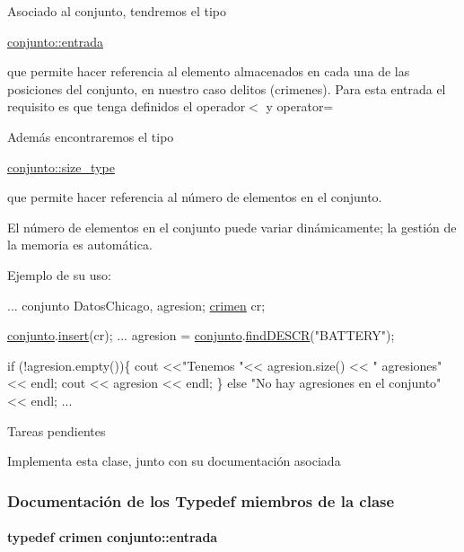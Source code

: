 Asociado al conjunto, tendremos el tipo
\begin{DoxyCode}
\hyperlink{classcrimen}{conjunto::entrada} 
\end{DoxyCode}
 que permite hacer referencia al elemento almacenados en cada una de las posiciones del conjunto, en nuestro caso delitos (crimenes). Para esta entrada el requisito es que tenga definidos el operador$<$ y operator=

Además encontraremos el tipo
\begin{DoxyCode}
\hyperlink{classconjunto_a855a5893bb0f5a851ab2dbf2b8aa6cc7}{conjunto::size\_type} 
\end{DoxyCode}
 que permite hacer referencia al número de elementos en el conjunto.

El número de elementos en el conjunto puede variar dinámicamente; la gestión de la memoria es automática.

Ejemplo de su uso\+: 
\begin{DoxyCode}
...
conjunto DatosChicago, agresion;
\hyperlink{classcrimen}{crimen} cr;

\hyperlink{classconjunto}{conjunto}.\hyperlink{classconjunto_aa65b9f7c4cb9bad6d4e40c1973095930}{insert}(cr);
...
agresion = \hyperlink{classconjunto}{conjunto}.\hyperlink{classconjunto_a5190c59db573008cc48a8ce734954a96}{findDESCR}(\textcolor{stringliteral}{"BATTERY"});

\textcolor{keywordflow}{if} (!agresion.empty())\{
 cout <<\textcolor{stringliteral}{"Tenemos "}<< agresion.size() << \textcolor{stringliteral}{" agresiones"} << endl;
 cout << agresion << endl;
\} \textcolor{keywordflow}{else} \textcolor{stringliteral}{"No hay agresiones en el conjunto"} << endl;
...
\end{DoxyCode}
 \begin{DoxyRefDesc}{Tareas pendientes}
\item[\hyperlink{todo__todo000003}{Tareas pendientes}]Implementa esta clase, junto con su documentación asociada \end{DoxyRefDesc}


\subsubsection{Documentación de los \textquotesingle{}Typedef\textquotesingle{} miembros de la clase}
\hypertarget{classconjunto_a09cad766dd65de73e51eae21f9d22585}{}
\paragraph[{entrada}]{\setlength{\rightskip}{0pt plus 5cm}typedef {\bf crimen} {\bf conjunto\+::entrada}}\label{classconjunto_a09cad766dd65de73e51eae21f9d22585}


